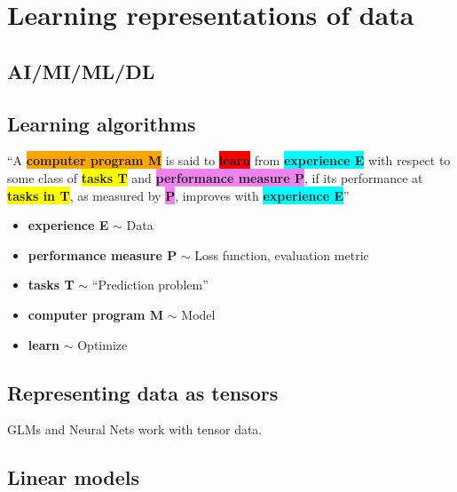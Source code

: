 \section{Learning representations of data}
\subsection{AI/MI/ML/DL}
\begin{definition}
\end{definition}
\subsection{Learning algorithms}
\begin{definition}
    \textquotedblleft A \colorbox{orange}{\textbf{computer program M}} is said to \colorbox{red}{\textbf{learn}} from \colorbox{cyan}{\textbf{experience E}} with respect to some class of \colorbox{yellow}{\textbf{tasks T}} and \colorbox{violet}{\textbf{performance measure P}}, if its performance at \colorbox{yellow}{\textbf{tasks in T}}, as measured by \colorbox{violet}{\textbf{P}}, improves with \colorbox{cyan}{\textbf{experience E}}\textquotedblright
    \vspace{1em}

    \begin{itemize}
        \item \textbf{\color{cyan}experience E} $\sim$ Data
        \item \textbf{\color{violet}performance measure P} $\sim$ Loss function, evaluation metric
        \item \textbf{\color{yellow}tasks T} $\sim$ ``Prediction problem''
        \item \textbf{\color{orange}computer program M} $\sim$ Model
        \item \textbf{\color{red}learn} $\sim$ Optimize
    \end{itemize}
\end{definition}

\subsection{Representing data as tensors}
\begin{definition}
    GLMs and Neural Nets work with tensor data.
\end{definition}
\newpage

\subsection{Linear models}
